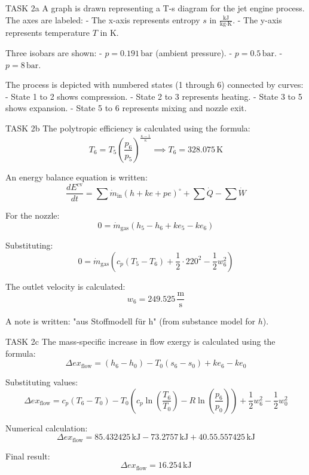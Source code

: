 TASK 2a  
A graph is drawn representing a T-s diagram for the jet engine process. The axes are labeled:  
- The x-axis represents entropy \( s \) in \( \frac{\text{kJ}}{\text{kg·K}} \).  
- The y-axis represents temperature \( T \) in \( \text{K} \).  

Three isobars are shown:  
- \( p = 0.191 \, \text{bar} \) (ambient pressure).  
- \( p = 0.5 \, \text{bar} \).  
- \( p = 8 \, \text{bar} \).  

The process is depicted with numbered states (1 through 6) connected by curves:  
- State 1 to 2 shows compression.  
- State 2 to 3 represents heating.  
- State 3 to 5 shows expansion.  
- State 5 to 6 represents mixing and nozzle exit.  

TASK 2b  
The polytropic efficiency is calculated using the formula:  
\[
T_6 = T_5 \left( \frac{p_6}{p_5} \right)^{\frac{\kappa - 1}{\kappa}} \implies T_6 = 328.075 \, \text{K}
\]

An energy balance equation is written:  
\[
\frac{dE^{\text{cv}}}{dt} = \sum \dot{m}_{\text{in}} \left( h + ke + pe \right)^{\circ} + \sum \dot{Q} - \sum \dot{W}
\]

For the nozzle:  
\[
0 = \dot{m}_{\text{gas}} \left( h_5 - h_6 + ke_5 - ke_6 \right)
\]

Substituting:  
\[
0 = \dot{m}_{\text{gas}} \left( c_p \left( T_5 - T_6 \right) + \frac{1}{2} \cdot 220^2 - \frac{1}{2} w_6^2 \right)
\]

The outlet velocity is calculated:  
\[
w_6 = 249.525 \, \frac{\text{m}}{\text{s}}
\]

A note is written: "aus Stoffmodell für h" (from substance model for \( h \)).

TASK 2c  
The mass-specific increase in flow exergy is calculated using the formula:  
\[
\Delta ex_{\text{flow}} = (h_6 - h_0) - T_0 (s_6 - s_0) + ke_6 - ke_0
\]

Substituting values:  
\[
\Delta ex_{\text{flow}} = c_p (T_6 - T_0) - T_0 \left( c_p \ln \left( \frac{T_6}{T_0} \right) - R \ln \left( \frac{p_6}{p_0} \right) \right) + \frac{1}{2} w_6^2 - \frac{1}{2} w_0^2
\]

Numerical calculation:  
\[
\Delta ex_{\text{flow}} = 85.432425 \, \text{kJ} - 73.2757 \, \text{kJ} + 40.55.557425 \, \text{kJ}
\]

Final result:  
\[
\Delta ex_{\text{flow}} = 16.254 \, \text{kJ}
\]